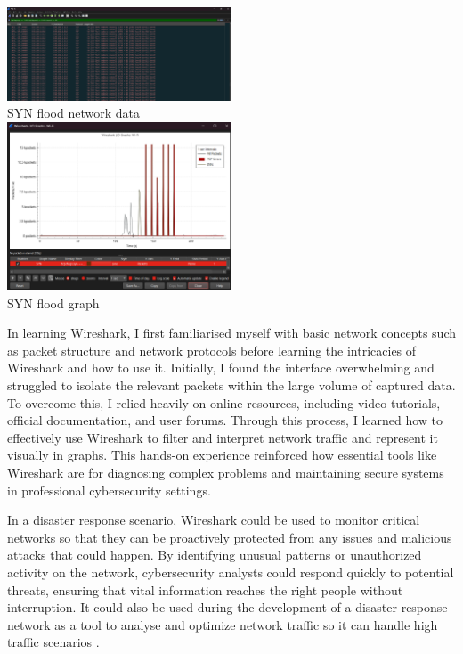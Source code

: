 \documentclass[a4paper, 11pt]{report}
\begin{document}
\begin{center}
	
	\includegraphics[width=0.5\textwidth]{wireshark3.png} \\
	SYN flood network data \\ 

	\includegraphics[width=0.5\textwidth]{wireshark4.png} \\
	SYN flood graph \\

\end{center}

In learning Wireshark, I first familiarised myself with basic network concepts such as packet structure and network protocols before learning the intricacies of Wireshark and how to use it. Initially, I found the interface overwhelming and struggled to isolate the relevant packets within the large volume of captured data. To overcome this, I relied heavily on online resources, including video tutorials, official documentation, and user forums. Through this process, I learned how to effectively use Wireshark to filter and interpret network traffic and represent it visually in graphs. This hands-on experience reinforced how essential tools like Wireshark are for diagnosing complex problems and maintaining secure systems in professional cybersecurity settings.

In a disaster response scenario, Wireshark could be used to monitor critical networks so that they can be proactively protected from any issues and malicious attacks that could happen. By identifying unusual patterns or unauthorized activity on the network, cybersecurity analysts could respond quickly to potential threats, ensuring that vital information reaches the right people without interruption. It could also be used during the development of a disaster response network as a tool to analyse and optimize network traffic so it can handle high traffic scenarios \cite{soepeno2023}. 
\end{document}
